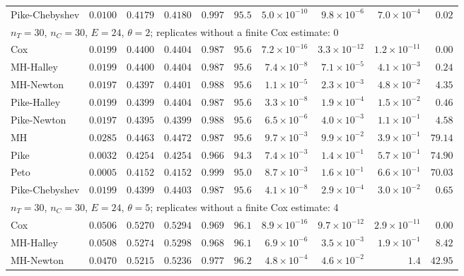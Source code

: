 \begin{landscape}
\begin{longtable}{lrrrrrrrrr}
Pike-Chebyshev & $0.0100$ & $0.4179$ & $0.4180$ & $0.997$ & $95.5$ & $5.0 \times 10^{-10}$ & $9.8 \times 10^{-6}$ & $7.0 \times 10^{-4}$ & $0.02$ \\
\multicolumn{10}{l}{$n_T = 30$, $n_C = 30$, $E = 24$, $\theta = 2$; replicates without a finite Cox estimate: 0} \\
Cox & $0.0199$ & $0.4400$ & $0.4404$ & $0.987$ & $95.6$ & $7.2 \times 10^{-16}$ & $3.3 \times 10^{-12}$ & $1.2 \times 10^{-11}$ & $0.00$ \\
MH-Halley & $0.0199$ & $0.4400$ & $0.4404$ & $0.987$ & $95.6$ & $7.4 \times 10^{-8}$ & $7.1 \times 10^{-5}$ & $4.1 \times 10^{-3}$ & $0.24$ \\
MH-Newton & $0.0197$ & $0.4397$ & $0.4401$ & $0.988$ & $95.6$ & $1.1 \times 10^{-5}$ & $2.3 \times 10^{-3}$ & $4.8 \times 10^{-2}$ & $4.35$ \\
Pike-Halley & $0.0199$ & $0.4399$ & $0.4404$ & $0.987$ & $95.6$ & $3.3 \times 10^{-8}$ & $1.9 \times 10^{-4}$ & $1.5 \times 10^{-2}$ & $0.46$ \\
Pike-Newton & $0.0197$ & $0.4395$ & $0.4399$ & $0.988$ & $95.6$ & $6.5 \times 10^{-6}$ & $4.0 \times 10^{-3}$ & $1.1 \times 10^{-1}$ & $4.58$ \\
MH & $0.0285$ & $0.4463$ & $0.4472$ & $0.987$ & $95.6$ & $9.7 \times 10^{-3}$ & $9.9 \times 10^{-2}$ & $3.9 \times 10^{-1}$ & $79.14$ \\
Pike & $0.0032$ & $0.4254$ & $0.4254$ & $0.966$ & $94.3$ & $7.4 \times 10^{-3}$ & $1.4 \times 10^{-1}$ & $5.7 \times 10^{-1}$ & $74.90$ \\
Peto & $0.0005$ & $0.4152$ & $0.4152$ & $0.999$ & $95.0$ & $8.7 \times 10^{-3}$ & $1.6 \times 10^{-1}$ & $6.6 \times 10^{-1}$ & $70.03$ \\
Pike-Chebyshev & $0.0199$ & $0.4399$ & $0.4403$ & $0.987$ & $95.6$ & $4.1 \times 10^{-8}$ & $2.9 \times 10^{-4}$ & $3.0 \times 10^{-2}$ & $0.65$ \\
\multicolumn{10}{l}{$n_T = 30$, $n_C = 30$, $E = 24$, $\theta = 5$; replicates without a finite Cox estimate: 4} \\
Cox & $0.0506$ & $0.5270$ & $0.5294$ & $0.969$ & $96.1$ & $8.9 \times 10^{-16}$ & $9.7 \times 10^{-12}$ & $2.9 \times 10^{-11}$ & $0.00$ \\
MH-Halley & $0.0508$ & $0.5274$ & $0.5298$ & $0.968$ & $96.1$ & $6.9 \times 10^{-6}$ & $3.5 \times 10^{-3}$ & $1.9 \times 10^{-1}$ & $8.42$ \\
MH-Newton & $0.0470$ & $0.5215$ & $0.5236$ & $0.977$ & $96.2$ & $4.8 \times 10^{-4}$ & $4.6 \times 10^{-2}$ & $1.4$ & $42.95$ \\

\end{longtable}
\end{landscape}
